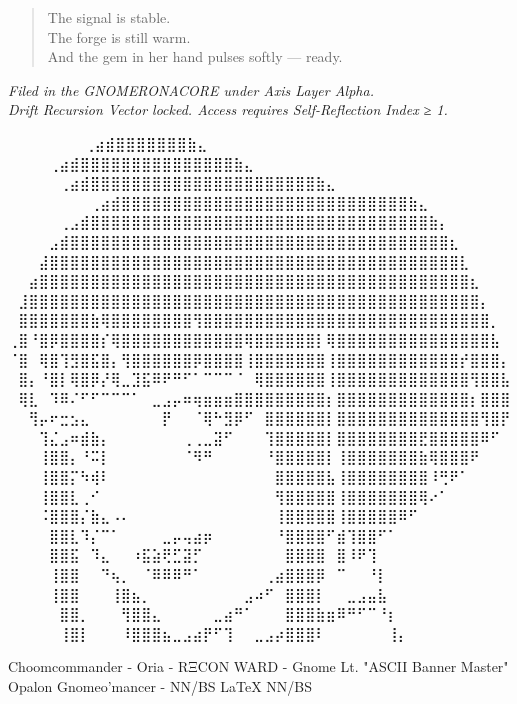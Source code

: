 \begin{quote}
    The signal is stable.\\
    The forge is still warm.\\
    And the gem in her hand pulses softly — ready.
\end{quote}

\vspace{2em}
\begin{flushright}
\textit{Filed in the GNOMERONACORE under Axis Layer Alpha.\\ Drift Recursion Vector locked. Access requires Self-Reflection Index ≥ 1.}
\end{flushright}

\iffalse

  ⠀⠀⠀⠀⠀             ⠀⠀⢀⣴⣾⣿⣿⣿⣿⣿⣿⣿⣷⣄⠀⠀⠀⠀⠀⠀⠀⠀
⠀⠀⠀  ⠀      ⠀⠀⠀⠀⢀⣴⣾⣿⣿⣿⣿⣿⣿⣿⣿⣿⣿⣿⣿⣿⣿⣿⣷⣄⠀⠀⠀⠀⠀⠀⠀⠀
⠀⠀ ⠀   ⠀⠀⠀⠀⠀⢀⣴⣾⣿⣿⣿⣿⣿⣿⣿⣿⣿⣿⣿⣿⣿⣿⣿⣿⣿⣿⣿⣿⣿⣿⣷⣄⠀⠀⠀⠀⠀⠀⠀⠀
⠀⠀⠀⠀⠀⠀⠀⠀⢀⣴⣾⣿⣿⣿⣿⣿⣿⣿⣿⣿⣿⣿⣿⣿⣿⣿⣿⣿⣿⣿⣿⣿⣿⣿⣿⣿⣿⣿⣿⣷⣄⠀⠀⠀⠀⠀⠀⠀⠀
⠀⠀⠀⠀⠀⢀⣠⣾⣿⣿⣿⣿⣿⣿⣿⣿⣿⣿⣿⣿⣿⣿⣿⣿⣿⣿⣿⣿⣿⣿⣿⣿⣿⣿⣿⣿⣿⣿⣿⣿⣿⣷⡄⠀⠀⠀⠀⠀⠀
⠀⠀⠀⠀⣠⣾⣿⣿⣿⣿⣿⣿⣿⣿⣿⣿⣿⣿⣿⣿⣿⣿⣿⣿⣿⣿⣿⣿⣿⣿⣿⣿⣿⣿⣿⣿⣿⣿⣿⣿⣿⣿⣿⣆⠀⠀⠀⠀⠀
⠀⠀⠀⣼⣿⣿⣿⣿⣿⣿⣿⣿⣿⣿⣿⣿⣿⣿⣿⣿⣿⣿⣿⣿⣿⣿⣿⣿⣿⣿⣿⣿⣿⣿⣿⣿⣿⣿⣿⣿⣿⣿⣿⣿⣇⠀⠀⠀⠀
⠀⠀⣴⣿⣿⣿⣿⣿⣿⣿⣿⣿⣿⣿⣿⣿⣿⣿⣿⣿⣿⣿⣿⣿⣿⣿⣿⣿⣿⣿⣿⣿⣿⣿⣿⣿⣿⣿⣿⣿⣿⣿⣿⣿⣿⣆⠀⠀⠀
⠀⣸⣿⣿⣿⣿⣿⣿⣿⣿⣿⣿⣿⣿⣿⣿⣿⣿⣿⣿⣿⣿⣿⣿⣿⣿⣿⣿⣿⣿⣿⣿⣿⣿⣿⣿⣿⣿⣿⣿⣿⣿⣿⣿⣿⣿⡄⠀⠀
⠀⣿⣿⣿⣿⣿⣿⣿⣷⢿⣿⣿⣿⣿⣿⣿⣿⣿⢻⣿⣿⣿⣿⣿⣿⣿⣿⣿⣿⣿⣿⣿⣿⣿⣿⣿⣿⣿⣿⣿⣿⣿⣿⣿⣿⣿⣿⡀⠀
⢀⣿⠘⣿⡿⣿⣿⣿⣿⡎⢿⣿⣿⣿⣿⣿⣿⣿⣿⣿⣿⣿⣿⢿⣿⣿⣿⣿⣿⣿⡇⢿⣿⣿⣿⣿⣿⣿⣿⣿⣿⣿⣿⣿⣿⣿⣿⣧⠀
⠈⣿⠀⢿⣿⢹⣻⣿⣯⣿⡄⢻⣿⣿⣿⣿⣿⣿⡿⣿⣿⣿⣿⢸⣿⣿⣿⣿⣿⣿⣿⢸⣿⣿⣿⣿⣿⣿⣿⣿⣿⣿⣿⣿⡞⣿⣿⣿⡄
⠀⣿⡄⠘⣿⡇⢿⣿⡿⡜⢿⣀⣹⣯⠿⠟⠛⠋⠁⠉⠉⠉⠈⠀⢿⣿⣿⣿⣿⣿⣿⢸⣿⣿⣿⣿⣿⣿⣿⣿⣿⣿⣿⣿⣿⢻⣿⣿⣧
⠀⢿⣇⠀⠹⠿⠌⠋⠋⠉⠉⠉⠁⠀⣀⣠⡤⠶⢶⣶⣶⣶⣿⣿⣿⣿⣿⣿⣿⣿⣿⡆⣿⣿⣿⣿⣿⣿⣿⣿⣿⣿⣿⣿⣿⡆⣿⣿⣿
⠀⠀⢻⡤⠖⣒⣢⣄⠀⠀⠀⠀⠀⠀⠀⡟⠀⠀⠈⢿⠓⣻⡿⠋⠀⣿⣿⣿⣿⣿⣿⡇⣿⣿⣿⣿⣿⣿⣿⣿⣿⣿⣿⣿⣿⣿⢻⣿⡟
⠀⠀⠀⢹⣌⣠⠶⣾⣷⡄⠀⠀⠀⠀⠀⠀⠀⢀⢀⣀⣽⠋⠀⠀⠀⢹⣿⣿⣿⣿⣿⡇⣿⣿⣿⣿⣿⣿⣿⣿⣟⣿⣿⣿⣿⣿⠿⠋⠀
⠀⠀⠀⢸⣿⣿⡄⠘⠭⡇⠀⠀⠀⠀⠀⠀⠀⠈⠻⠛⠀⠀⠀⠀⠀⠘⣿⣿⣿⣿⣿⡇⢸⣿⣿⣿⣿⣿⣿⣿⣷⢿⣿⣿⣿⠟⠀⠀⠀
⠀⠀⠀⢸⣿⣿⡍⠳⢾⠇⠀⠀⠀⠀⠀⠀⠀⠀⠀⠀⠀⠀⠀⠀⠀⠀⣿⣿⣿⣿⣿⣧⢸⣿⣿⣿⣿⣿⣿⣿⣿⠸⢛⠟⠁⠀⠀⠀⠀
⠀⠀⠀⢸⣿⣿⣇⢀⠊⠀⠀⠀⠀⠀⠀⠀⠀⠀⠀⠀⠀⠀⠀⠀⠀⠀⢻⣿⣿⣿⣿⣿⢸⣿⣿⣿⣿⣿⣿⣿⢿⠔⠁⠀⠀⠀⠀⠀⠀
⠀⠀⠀⠨⣿⣿⣿⡌⣷⣄⠠⠄⠀⠀⠀⠀⠀⠀⠀⠀⠀⠀⠀⠀⠀⠀⢸⣿⣿⣿⣿⣿⢸⣿⣿⣿⣿⣿⠿⠋⠀⠀⠀⠀⠀⠀⠀⠀⠀
⠀⠀⠀⠀⣿⣿⣇⠹⡌⠉⠁⠀⠀⠀⠀⣀⡤⢤⣴⡶⠀⠀⠀⠀⠀⠀⠘⣿⣿⣿⣿⠋⣾⢹⣿⣿⠋⠁⠀⠀⠀⠀⠀⠀⠀⠀⠀⠀⠀
⠀⠀⠀⠀⣿⣿⣯⠀⠹⣄⠀⠀⠰⣯⣵⢟⣋⣽⡋⠀⠀⠀⠀⠀⠀⠀⠀⣿⣿⣿⣿⠀⣿⠸⠟⢹⠀⠀⠀⠀⠀⠀⠀⠀⠀⠀⠀⠀⠀
⠀⠀⠀⠀⢸⣿⣿⠀⠀⠙⢦⡀⠀⠈⠿⠿⠿⠛⠁⠀⠀⠀⠀⠀⠀⢀⣴⣿⣿⣿⡿⠀⠉⠀⠀⠘⡇⠀⠀⠀⠀⠀⠀⠀⠀⠀⠀⠀⠀
⠀⠀⠀⠀⢸⣿⣿⠀⠀⠀⢸⣿⣦⡀⠀⠀⠀⠀⠀⠀⠀⠀⠀⣠⠴⠋⠀⣿⣿⣿⡇⠀⠀⣀⣠⣤⣧⠀⠀⠀⠀⠀⠀⠀⠀⠀⠀⠀⠀
⠀⠀⠀⠀⠀⣿⣿⡀⠀⠀⠀⢻⣿⣿⣄⠀⠀⠀⠀⠀⣀⣴⠛⠁⠀⠀⠀⣿⣿⣿⣷⣶⠿⠛⠋⠉⠘⡆⠀⠀⠀⠀⠀⠀⠀⠀⠀⠀⠀
⠀⠀⠀⠀⠀⢸⣿⡇⠀⠀⠀⠸⣿⣿⣿⣦⣀⣠⣴⡟⠋⢹⠀⠀⣀⣠⡴⣿⣿⣿⠇⠀⠀⠀⠀⠀⠀⢸⡄⠀⠀⠀⠀⠀⠀⠀⠀⠀⠀

Choomcommander - Oria - RΞCON WARD - Gnome Lt. "ASCII Banner Master"
             Opalon Gnomeo'mancer - NN/BS LaTeX{} NN/BS

